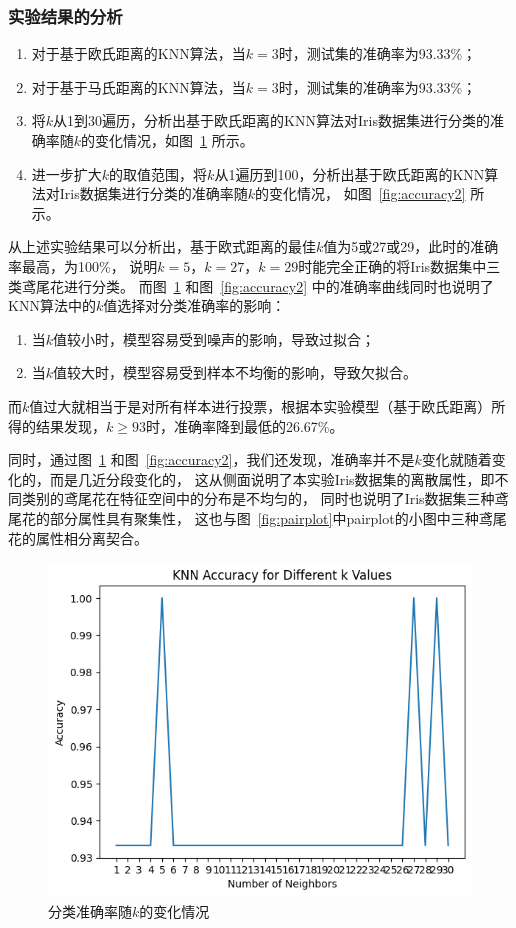 \documentclass[12pt]{article}
\begin{document}
\subsubsection{实验结果的分析}

\begin{enumerate}
  \item 对于基于欧氏距离的KNN算法，当$k=3$时，测试集的准确率为93.33\%；
  \item 对于基于马氏距离的KNN算法，当$k=3$时，测试集的准确率为93.33\%；
  \item 将$k$从1到30遍历，分析出基于欧氏距离的KNN算法对Iris数据集进行分类的准确率随$k$的变化情况，如图~\ref{fig:accuracy} 所示。
  \item 进一步扩大$k$的取值范围，将$k$从1遍历到100，分析出基于欧氏距离的KNN算法对Iris数据集进行分类的准确率随$k$的变化情况，
        如图~\ref{fig:accuracy2} 所示。
\end{enumerate}
从上述实验结果可以分析出，基于欧式距离的最佳$k$值为5或27或29，此时的准确率最高，为100\%，
说明$k=5$，$k=27$，$k=29$时能完全正确的将Iris数据集中三类鸢尾花进行分类。
而图~\ref{fig:accuracy} 和图~\ref{fig:accuracy2} 中的准确率曲线同时也说明了KNN算法中的$k$值选择对分类准确率的影响：
\begin{enumerate}
  \item 当$k$值较小时，模型容易受到噪声的影响，导致过拟合；
  \item 当$k$值较大时，模型容易受到样本不均衡的影响，导致欠拟合。
\end{enumerate}
而$k$值过大就相当于是对所有样本进行投票，根据本实验模型（基于欧氏距离）所得的结果发现，$k \geq 93$时，准确率降到最低的26.67\%。

同时，通过图~\ref{fig:accuracy} 和图~\ref{fig:accuracy2}，我们还发现，准确率并不是$k$变化就随着变化的，而是几近分段变化的，
这从侧面说明了本实验Iris数据集的离散属性，即不同类别的鸢尾花在特征空间中的分布是不均匀的，
同时也说明了Iris数据集三种鸢尾花的部分属性具有聚集性，
这也与图~\ref{fig:pairplot}中pairplot的小图中三种鸢尾花的属性相分离契合。

\begin{figure}[htbp]
  \centering
  \includegraphics[scale=0.8]{figures/knn/accuracy.png}
  \caption{分类准确率随$k$的变化情况}
  \label{fig:accuracy}
\end{figure}
\end{document}
